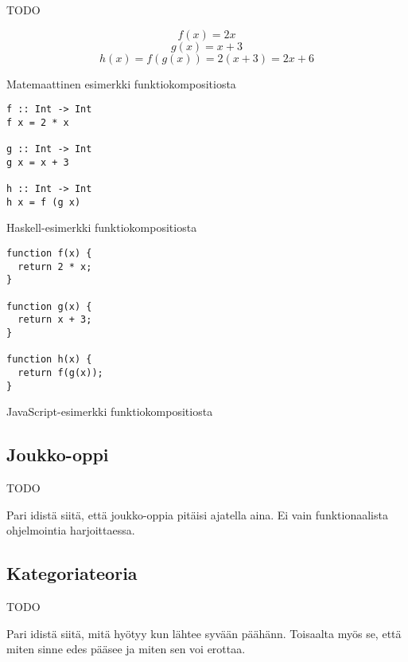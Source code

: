 TODO

\begin{code}
  \begin{equation}
    f(x) = 2x
  \end{equation}
  \begin{equation}
    g(x) = x + 3
  \end{equation}
  \begin{equation}
    h(x) = f(g(x)) = 2(x + 3) = 2x + 6
  \end{equation}
  \caption{Matemaattinen esimerkki funktiokompositiosta}
  \label{equation:composition}
\end{code}
\bigskip

\begin{code}
  \begin{verbatim}
f :: Int -> Int
f x = 2 * x

g :: Int -> Int
g x = x + 3

h :: Int -> Int
h x = f (g x)
\end{verbatim}
  \caption{Haskell-esimerkki funktiokompositiosta}
  \label{code:haskell_composition}
\end{code}
\bigskip
\begin{code}
  \begin{verbatim}
function f(x) {
  return 2 * x;
}

function g(x) {
  return x + 3;
}

function h(x) {
  return f(g(x));
}
\end{verbatim}
  \caption{JavaScript-esimerkki funktiokompositiosta}
  \label{code:javascript_composition}
\end{code}


\subsection{Joukko-oppi}

TODO

Pari idistä siitä, että joukko-oppia pitäisi ajatella aina. Ei vain funktionaalista ohjelmointia harjoittaessa.

\subsection{Kategoriateoria}

TODO

Pari idistä siitä, mitä hyötyy kun lähtee syvään päähänn. Toisaalta myös se, että miten sinne edes pääsee ja miten sen voi erottaa.

